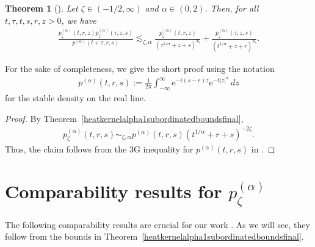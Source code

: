 \documentclass[12pt,reqno,a4paper]{amsart}
\newtheorem{theorem}{Theorem}[section]
\theoremstyle{definition}
\theoremstyle{remark}
\numberwithin{equation}{section}
\newcommand{\1}{\mathbbm{1}}
\newcommand{\me}[1]{\mathrm{e}^{#1}}
\begin{document}
\begin{theorem}[{\cite[Lemma~2.5]{Bogdanetal2024}}]
  \label{lem:3Gineq}
  Let $\zeta\in(-1/2,\infty)$ and $\alpha\in(0,2)$. Then, for all $t,\tau,t,s,r,z>0$, we have
  \begin{align}
    \frac{p_\zeta^{(\alpha)}(t,r,z) p_\zeta^{(\alpha)}(\tau,z,s)}{p^{(\alpha)}(t+\tau,r,s)}
    \lesssim_{\zeta,\alpha} \frac{p_\zeta^{(\alpha)}(t,r,z)}{(\tau^{1/\alpha}+z+s)^{2\zeta}} + \frac{p_\zeta^{(\alpha)}(\tau,z,s)}{(t^{1/\alpha}+z+r)^{2\zeta}}.
  \end{align}
\end{theorem}

For the sake of completeness, we give the short proof using the notation
\begin{align}
  \label{eq:stabledensity}
  p^{(\alpha)}(t,r,s) := \frac{1}{2\pi}\int_{-\infty}^\infty \me{-i(s-r)z} \me{-t|z|^\alpha}\,dz
\end{align}
for the stable density on the real line.

\begin{proof}
  By Theorem~\ref{heatkernelalpha1subordinatedboundsfinal},
  \begin{align*}
    p_\zeta^{(\alpha)}(t,r,s) \sim_{\zeta,\alpha} p^{(\alpha)}(t,r,s) (t^{1/\alpha} + r+s)^{-2\zeta}.
  \end{align*}
  Thus, the claim follows from the 3G inequality for $p^{(\alpha)}(t,r,s)$ in \cite[(7)--(9)]{BogdanJakubowski2007}.
\end{proof}

\section{Comparability results for $p_\zeta^{(\alpha)}$}
\label{s:comparison}

The following comparability results are crucial for our work \cite{Bogdanetal2024}. As we will see, they follow from the bounds in Theorem~\ref{heatkernelalpha1subordinatedboundsfinal}.
\end{document}
